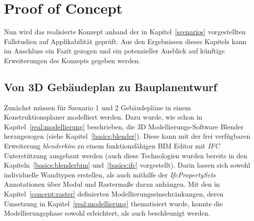 \chapter{Proof of Concept}
Nun wird das realisierte Konzept anhand der in Kapitel~\ref{scenarios} vorgestellten Fallstudien auf Applikabilität geprüft.
Aus den Ergebnissen dieses Kapitels kann im Anschluss ein Fazit gezogen und ein potenzieller Ausblick auf künftige Erweiterungen des Konzepts gegeben werden.

\section{Von 3D Gebäudeplan zu Bauplanentwurf}
Zunächst müssen für Szenario 1 und 2 Gebäudepläne in einem Konstruktionsplaner modelliert werden.
Dazu wurde, wie schon in Kapitel~\ref{real:modellierung} beschrieben, die 3D Modellierungs-Software Blender herangezogen (siehe Kapitel~\ref{basics:blender}).
Diese kann mit der frei verfügbaren Erweiterung \textit{blenderbim} zu einem funktionsfähigen BIM Editor mit \textit{IFC} Unterstützung ausgebaut werden (auch diese Technologien wurden bereits in den Kapiteln~\ref{basics:blenderbim} und~\ref{basics:ifc} vorgestellt).
Darin lassen sich sowohl individuelle Wandtypen erstellen, als auch mithilfe der \textit{IfcPropertySets} Annotationen über Modul und Rastermaße daran anhängen.
Mit den in Kapitel~\ref{concept:raster} definierten Modellierungseinschränkungen, deren Umsetzung in Kapitel~\ref{real:modellierung} thematisiert wurde, konnte die Modellierungsphase sowohl erleichtert, als auch beschleunigt werden.

